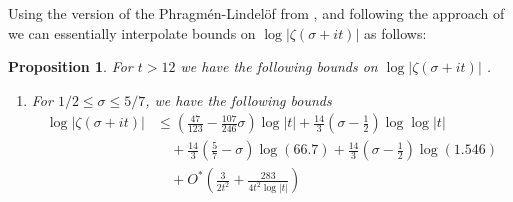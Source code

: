 \documentclass[10pt,english,letter, reqno]{amsart}
\newcommand{\Ostar}{O^{\ast}}
\theoremstyle{plain}
\newtheorem{proposition}[theorem]{Proposition}
\theoremstyle{definition}
\begin{document}
Using the version of the  Phragm\'en-Lindel\"of from \cite{Fiori2026}, and following the approach of \cite[Section~4]{Fiori2026} we can essentially interpolate bounds on $\log|\zeta(\sigma+it)|$ as follows:
\begin{proposition}\label{prop:interpolation}
For $t>12$
 we have the following bounds on $\log|\zeta(\sigma+it)|$ .
\begin{enumerate}
    \item For $1/2 \leq \sigma \leq 5/7$, we have the following bounds
    \begin{align*}
     \log|\zeta(\sigma+it)|
     &\leq \left(\frac{47}{123} - \frac{107}{246}\sigma\right)\log|t|+ \frac{14}{3}\left(\sigma-\frac{1}{2}\right)\log\log|t|\\&\quad  + \frac{14}{3}\left(\frac{5}{7}-\sigma\right)\log(66.7) + \frac{14}{3}\left(\sigma-\frac{1}{2}\right)\log(1.546)\\&\quad + \Ostar\!\left(\frac{3}{2t^2} + \frac{283}{4t^2\log|t|}\right)\\

\end{align*}
\end{enumerate}
\end{proposition}
\end{document}
